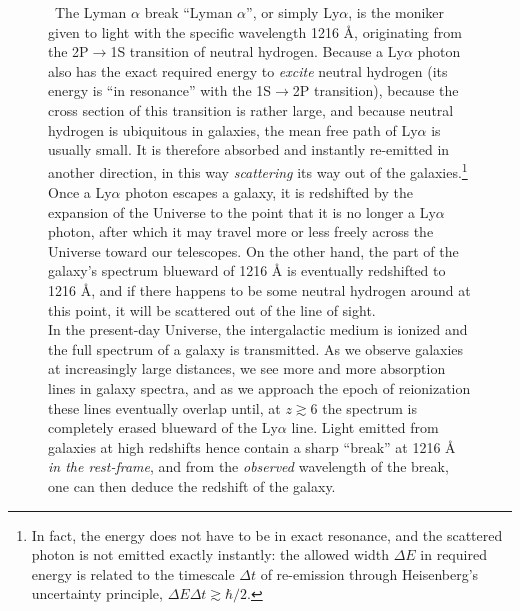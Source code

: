 \documentclass[useAMS]{aa}
\begin{document}
\begin{figure}[!t]
\begin{bclogo}[
    couleur=gray!20,
    epBord=1,
    arrondi=0.1,
    logo=\bcinfo,
    marge=8,
    ombre=false, %
    couleurBord=gray!60,
    barre=line]
    { \ \textsf{The Lyman $\alpha$ break}}
    \small{\textsf{``Lyman $\alpha$'', or simply Ly$\alpha$, is the moniker given to light with the specific wavelength 1216 {\AA}, originating from the 2P$\rightarrow$1S transition of neutral hydrogen.
    Because a Ly$\alpha$ photon also has the exact required energy to \emph{excite} neutral hydrogen (its energy is ``in resonance'' with the 1S$\rightarrow$2P transition), because the cross section of this transition is rather large, and because neutral hydrogen is ubiquitous in galaxies, the mean free path of Ly$\alpha$ is usually small. It is therefore absorbed and instantly re-emitted in another direction, in this way \emph{scattering} its way out of the galaxies.\footnote{In fact, the energy does not have to be in exact resonance, and the scattered photon is not emitted exactly instantly: the allowed width $\Delta E$ in required energy is related to the timescale $\Delta t$ of re-emission through Heisenberg's uncertainty principle, $\Delta E \Delta t \gtrsim \hbar/2$.}\vspace{1mm}\\
    Once a Ly$\alpha$ photon escapes a galaxy, it is redshifted by the expansion of the Universe to the point that it is no longer a Ly$\alpha$ photon, after which it may travel more or less freely across the Universe toward our telescopes.
    On the other hand, the part of the galaxy's spectrum blueward of 1216 {\AA} is eventually redshifted to 1216 {\AA}, and if there happens to be some neutral hydrogen around at this point, it will be scattered out of the line of sight.\vspace{1mm}\\
    In the present-day Universe, the intergalactic medium is ionized and the full spectrum of a galaxy is transmitted.
    As we observe galaxies at increasingly large distances, we see more and more absorption lines in galaxy spectra, and as we approach the epoch of reionization these lines eventually overlap until, at $z\gtrsim6$ the spectrum is completely erased blueward of the Ly$\alpha$ line.
    Light emitted from galaxies at high redshifts hence contain a sharp ``break'' at 1216 {\AA} \emph{in the rest-frame}, and from the \emph{observed} wavelength of the break, one can then deduce the redshift of the galaxy.\vspace{1mm}\\
}}
\end{bclogo}
\end{figure}
\end{document}
